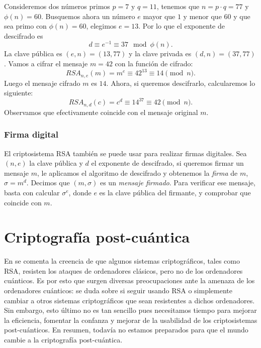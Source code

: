 \begin{exampleth}
    Consideremos dos números primos $p = 7$ y $q = 11$, tenemos que $n = p \cdot q = 77$ y $\phi(n) = 60$. Busquemos ahora un número $e$ mayor que $1$ y menor que $60$ y que sea primo con $\phi(n) = 60$, elegimos $e = 13$. Por lo que el exponente de descifrado es
    \[
        d \equiv e^{-1} \equiv 37 \mod{\phi(n)}.
    \]
    La clave pública es $(e, n) = (13, 77)$ y la clave privada es $(d, n) = (37, 77)$. Vamos a cifrar el mensaje $m = 42$ con la función de cifrado:
    \[
        RSA_{n, e}(m) = m^e \equiv 42^{13} \equiv 14 \pmod{n}.
    \]
    Luego el mensaje cifrado $m$ es $14$. Ahora, si queremos descifrarlo, calcularemos lo siguiente:
    \[
        RSA_{n, d}(c) = c^d \equiv 14^{37} \equiv 42 \pmod{n}.
    \]
    Observamos que efectivamente coincide con el mensaje original $m$.
\end{exampleth}

\subsubsection{Firma digital}

El criptosistema RSA también se puede usar para realizar firmas digitales. Sea $(n, e)$ la clave pública y $d$ el exponente de descifrado, si queremos firmar un mensaje $m$, le aplicamos el algoritmo de descifrado y obtenemos la \emph{firma} de $m$, $\sigma = m^d$. Decimos que $(m, \sigma)$ es un \emph{mensaje firmado}. Para verificar ese mensaje, basta con calcular $\sigma ^e$, donde $e$ es la clave pública del firmante, y comprobar que coincide con $m$.

\section{Criptografía post-cuántica}

En \cite{Post-Quantum_Cryptography_2009} se comenta la creencia de que algunos sistemas criptográficos, tales como RSA, resisten los ataques de ordenadores clásicos, pero no de los ordenadores cuánticos. Es por esto que surgen diversas preocupaciones ante la amenaza de los ordenadores cuánticos: se duda sobre si seguir usando RSA o simplemente cambiar a otros sistemas criptográficos que sean resistentes a dichos ordenadores. Sin embargo, esto último no es tan sencillo pues necesitamos tiempo para mejorar la eficiencia, fomentar la confanza y mejorar de la usabilidad de los criptosistemas post-cuánticos. En resumen, todavía no estamos preparados para que el mundo cambie a la criptografía post-cuántica.

